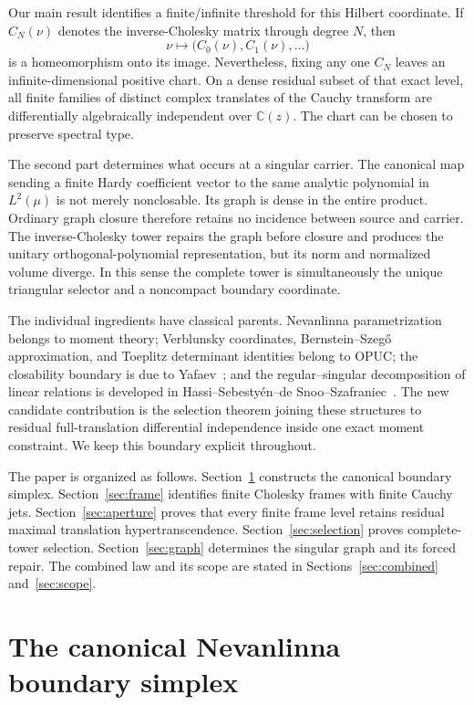 \documentclass[11pt]{article}
\newcommand{\C}{\mathbb C}
\begin{document}
Our main result identifies a finite/infinite threshold for this Hilbert coordinate.  If
$C_N(\nu)$ denotes the inverse-Cholesky matrix through degree $N$, then
\[
  \nu\longmapsto \bigl(C_0(\nu),C_1(\nu),\ldots\bigr)
\]
is a homeomorphism onto its image.  Nevertheless, fixing any one $C_N$ leaves an
infinite-dimensional positive chart.  On a dense residual subset of that exact level, all finite
families of distinct complex translates of the Cauchy transform are differentially algebraically
independent over $\C(z)$.  The chart can be chosen to preserve spectral type.

The second part determines what occurs at a singular carrier.  The canonical map sending a finite
Hardy coefficient vector to the same analytic polynomial in $L^2(\mu)$ is not merely
nonclosable.  Its graph is dense in the entire product.  Ordinary graph closure therefore retains
no incidence between source and carrier.  The inverse-Cholesky tower repairs the graph before
closure and produces the unitary orthogonal-polynomial representation, but its norm and normalized
volume diverge.  In this sense the complete tower is simultaneously the unique triangular
selector and a noncompact boundary coordinate.

The individual ingredients have classical parents.  Nevanlinna parametrization belongs to moment
theory; Verblunsky coordinates, Bernstein--Szeg\H{o} approximation, and Toeplitz determinant
identities belong to OPUC; the closability boundary is due to Yafaev~\cite{Yafaev2016}; and the
regular--singular decomposition of linear relations is developed in
Hassi--Sebesty\'en--de Snoo--Szafraniec~\cite{HassiEtAl2007}.  The new candidate contribution is
the selection theorem joining these structures to residual full-translation differential
independence inside one exact moment constraint.  We keep this boundary explicit throughout.

The paper is organized as follows.  Section~\ref{sec:boundary} constructs the canonical boundary
simplex.  Section~\ref{sec:frame} identifies finite Cholesky frames with finite Cauchy jets.
Section~\ref{sec:aperture} proves that every finite frame level retains residual maximal
translation hypertranscendence.  Section~\ref{sec:selection} proves complete-tower selection.
Section~\ref{sec:graph} determines the singular graph and its forced repair.  The combined law and
its scope are stated in Sections~\ref{sec:combined} and~\ref{sec:scope}.

\section{The canonical Nevanlinna boundary simplex}\label{sec:boundary}
\end{document}
